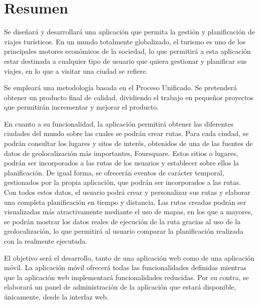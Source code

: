 \newpage
\chapter*{Resumen}
Se diseñará y desarrollará una aplicación que permita la gestión y planificación de viajes turísticos. En un mundo totalmente globalizado, el turismo es uno de los principales motores económicos de la sociedad, lo que permitirá a esta aplicación estar destinada a cualquier tipo de usuario que quiera gestionar y planificar sus viajes, en lo que a visitar una ciudad se refiere.

Se empleará una metodología basada en el Proceso Unificado. Se pretenderá obtener un producto final de calidad, dividiendo el trabajo en pequeños proyectos que permitirán incrementar y mejorar el producto.

En cuanto a su funcionalidad, la aplicación permitirá obtener las diferentes ciudades del mundo sobre las cuales se podrán crear rutas. Para cada ciudad, se podrán consultar los lugares y sitos de interés, obtenidos de una de las fuentes de datos de geolocalización más importantes, Foursquare. Estos sitios o lugares, podrán ser incorporados a las rutas de los usuarios y establecer sobre ellos la planificación. De igual forma, se ofrecerán eventos de carácter temporal, gestionados por la propia aplicación, que podrán ser incorporados a las rutas. Con todos estos datos, el usuario podrá crear y personalizar sus rutas y elaborar una completa planificación en tiempo y distancia. Las rutas creadas podrán ser visualizadas más atractivamente mediante el uso de mapas, en los que a mayores, se podrán mostrar los datos reales de ejecución de la ruta gracias al uso de la geolocalización, lo que permitirá al usuario comparar la planificación realizada con la realmente ejecutada.

El objetivo será el desarrollo, tanto de una aplicación web como de una aplicación móvil. La aplicación móvil ofrecerá todas las funcionalidades definidas mientras que la aplicación web implementará funcionalidades reducidas. Por su contra, se elaborará un panel de administración de la aplicación que estará disponible, únicamente, desde la interfaz web.